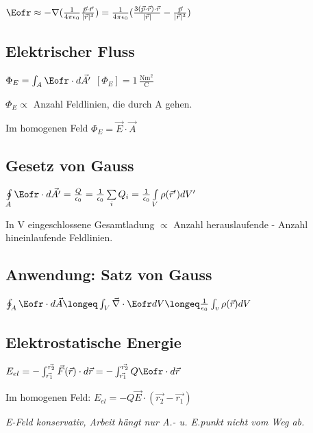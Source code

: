 \documentclass[10pt,a4paper]{scrartcl}
\begin{document}
\begin{multicols*}{3}
	$\Eofr \approx -\nabla(\frac{1}{4\pi\epsilon_0}\frac{\vec{p}\cdot\vec{r}}{|\vec{r}|^3})=\frac{1}{4\pi\epsilon_0}(\frac{3( \vec{p}\cdot\vec{r} )\cdot\vec{r}}{|\vec{r}|}-\frac{\vec{p}}{|\vec{r}|^3})$
	
	
	\subsection{Elektrischer Fluss}
	
	$\Phi_E= \int_A{\Eofr\cdot d \vec{A'}}$ \hfill $[\Phi_E]=\mathrm{1\,\frac{Nm^2}{C}}$
	
	$\Phi_E \propto$ Anzahl Feldlinien, die durch A gehen.
	
	Im homogenen Feld $\Phi_E = \vec{E}\cdot\vec{A}$
	
	\subsection{Gesetz von Gauss}
	
	$\oint\limits_{A}{\Eofr\cdot d \vec{A'}}=\frac{Q}{\epsilon_0}=\frac{1}{\epsilon_0}\sum\limits_{i}Q_i=\frac{1}{\epsilon_0}\int\limits_V\rho(\vec{r}')dV'$
	
	In V eingeschlossene Gesamtladung $\propto$ Anzahl herauslaufende - Anzahl hineinlaufende Feldlinien.	
	
	\subsection{Anwendung: Satz von Gauss}
	
	$\oint_A{\Eofr\cdot d \vec{A}}\longeq
	\int_V{\vec{\nabla}\cdot\Eofr dV}\longeq
	\frac{1}{\epsilon_0}\int_v{\rho(\vec{r})dV}$
	
	
	\subsection{Elektrostatische Energie}	
	
	$E_{el} =-\int_{\vec{r_1}}^{\vec{r_2}}
	{\vec{F}(\vec{r})\cdot d \vec{r}}=
	-\int_{\vec{r_1}}^{\vec{r_2}}
	{Q\Eofr\cdot d \vec{r}}$
	
	Im homogenen Feld: $E_{el}=-Q\vec{E}\cdot(\vec{r_2}-\vec{r_1})$
	
	\footnotesize
	\emph{E-Feld konservativ, Arbeit hängt nur A.- u. E.punkt nicht vom Weg ab.}\normalsize


\end{multicols*}
\end{document}

